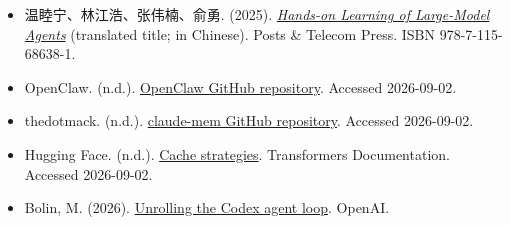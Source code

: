 \vspace{0.25em}
\begin{itemize}
\tightlist
\item
  温睦宁、林江浩、张伟楠、俞勇. (2025). \href{https://haa.boyuai.com/}{\emph{Hands-on Learning of Large-Model Agents}} (translated title; in Chinese). Posts \& Telecom Press. ISBN 978-7-115-68638-1.
\item
  OpenClaw. (n.d.). \href{https://github.com/openclaw/openclaw}{OpenClaw GitHub repository}. Accessed 2026-09-02.
\item
  thedotmack. (n.d.). \href{https://github.com/thedotmack/claude-mem}{claude-mem GitHub repository}. Accessed 2026-09-02.
\item
  Hugging Face. (n.d.). \href{https://huggingface.co/docs/transformers/main/kv_cache}{Cache strategies}. Transformers Documentation. Accessed 2026-09-02.
\item
  Bolin, M. (2026). \href{https://openai.com/index/unrolling-the-codex-agent-loop/}{Unrolling the Codex agent loop}. OpenAI.
\end{itemize}

\clearpage

